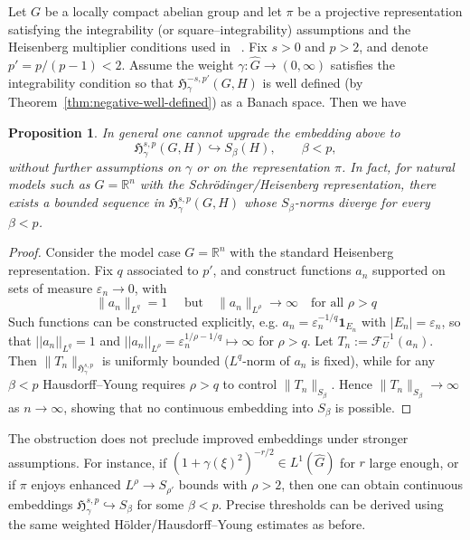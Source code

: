 \documentclass[11pt,a4paper]{article}
\newtheorem{proposition}[theorem]{Proposition}
\theoremstyle{definition}
\newcommand{\F}{\mathcal{F}}
\begin{document}
Let $G$ be a locally compact abelian group and let $\pi$ be a projective representation
satisfying the integrability (or square--integrability) assumptions and the Heisenberg
multiplier conditions used in ~\cite{LakmonMensah2025}. Fix $s>0$ and $p>2$, and denote $p' = p/(p-1)<2$.
Assume the weight $\gamma:\widehat G\to(0,\infty)$ satisfies the integrability condition so that $\mathfrak{H}^{-s,p'}_\gamma(G,H)$ is well defined (by Theorem~\ref{thm:negative-well-defined}) as a Banach space. Then we have


\begin{proposition}
\label{thm:improved-4.1}
In general one cannot upgrade the embedding above to
\[
   \mathfrak{H}^{s,p}_\gamma(G,H)\hookrightarrow S_\beta(H), \qquad \beta<p,
\]
without further assumptions on $\gamma$ or on the representation $\pi$. In fact, for natural models such as $G=\mathbb R^n$ with the Schr\"odinger/Heisenberg representation, there exists a bounded sequence in $\mathfrak{H}^{s,p}_\gamma(G,H)$ whose $S_\beta$-norms diverge for every $\beta<p$.
\end{proposition}

\begin{proof}
Consider the model case $G=\mathbb R^n$ with the standard Heisenberg representation. Fix $q$ associated to $p'$, and construct functions $a_n$ supported on sets of measure $\varepsilon_n\to0$, with
\[
   \|a_n\|_{L^q}=1 \quad \text{ but} \quad \|a_n\|_{L^\rho}\to\infty \quad
   \text{for all }\rho>q
\]
Such functions can be constructed explicitly, e.g. $a_n = \varepsilon_n^{-1/q} \textbf{1}_{E_n}$ with $|E_n|=\varepsilon_n$, so that $||a_n||_{L^q} =1$ and $||a_n||_{L^\rho} = \varepsilon_n^{1/\rho -1/q} \mapsto \infty$ for $\rho > q$. Let $T_n:=\F_U^{-1}(a_n)$. Then $\|T_n\|_{\mathfrak{H}^{s,p}_\gamma}$ is uniformly bounded ($L^q$-norm of $a_n$ is fixed), while for any $\beta<p$ Hausdorff--Young requires $\rho>q$ to control $\|T_n\|_{S_\beta}$. Hence $\|T_n\|_{S_\beta}\to\infty$ as $n\to\infty$, showing that no continuous embedding into $S_\beta$ is possible.
\end{proof}

The obstruction does not preclude improved embeddings under stronger
assumptions. For instance, if $(1+\gamma(\xi)^2)^{-r/2}\in L^1(\widehat G)$ for $r$ large enough, or if $\pi$ enjoys enhanced $L^\rho\to S_{\rho'}$ bounds with $\rho>2$, then one can obtain continuous embeddings $\mathfrak{H}^{s,p}_\gamma\hookrightarrow S_\beta$ for some $\beta<p$. Precise thresholds can be derived using the same weighted H\"older/Hausdorff--Young estimates as before.
\end{document}

